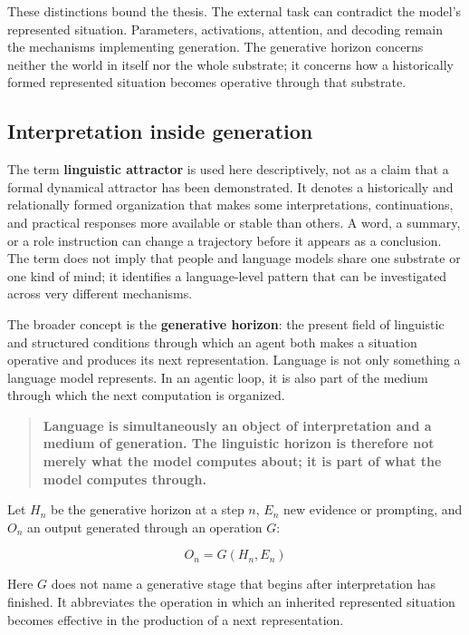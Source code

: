 \documentclass[12pt]{article}
\begin{document}
These distinctions bound the thesis. The external task can contradict the model's represented situation. Parameters, activations, attention, and decoding remain the mechanisms implementing generation. The generative horizon concerns neither the world in itself nor the whole substrate; it concerns how a historically formed represented situation becomes operative through that substrate.

\subsection{Interpretation inside generation}\label{interpretation-inside-generation}

The term \textbf{linguistic attractor} is used here descriptively, not as a claim that a formal dynamical attractor has been demonstrated. It denotes a historically and relationally formed organization that makes some interpretations, continuations, and practical responses more available or stable than others. A word, a summary, or a role instruction can change a trajectory before it appears as a conclusion. The term does not imply that people and language models share one substrate or one kind of mind; it identifies a language-level pattern that can be investigated across very different mechanisms.

The broader concept is the \textbf{generative horizon}: the present field of linguistic and structured conditions through which an agent both makes a situation operative and produces its next representation. Language is not only something a language model represents. In an agentic loop, it is also part of the medium through which the next computation is organized.

\begin{quote}
\textbf{Language is simultaneously an object of interpretation and a medium of generation. The linguistic horizon is therefore not merely what the model computes about; it is part of what the model computes through.}
\end{quote}

Let \(H_n\) be the generative horizon at a step \(n\), \(E_n\) new evidence or prompting, and \(O_n\) an output generated through an operation \(G\):

\[
O_n = G(H_n, E_n)
\]

Here \(G\) does not name a generative stage that begins after interpretation has finished. It abbreviates the operation in which an inherited represented situation becomes effective in the production of a next representation.
\end{document}
